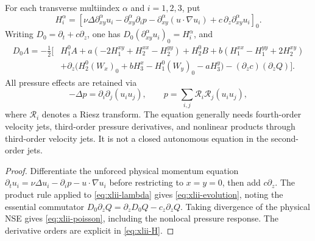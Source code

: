 \begin{theorem}
\label{thm:xlii-full}
For each transverse multiindex $\alpha$ and $i=1,2,3$, put
\begin{equation}\label{eq:xlii-H}
H_i^\alpha=\left[
\nu\Delta\partial_{xy}^\alpha u_i
-\partial_{xy}^\alpha\partial_i p
-\partial_{xy}^\alpha(u\cdot\nabla u_i)
+c\,\partial_z\partial_{xy}^\alpha u_i
\right]_0.
\end{equation}
Writing $D_0=\partial_t+c\partial_z$, one has
$D_0(\partial_{xy}^\alpha u_i)_0=H_i^\alpha$, and
\begin{equation}\label{eq:xlii-evolution}
\boxed{\begin{aligned}
D_0\Lambda=-\frac12\big[&
H_1^0 A+a(-2H_1^{xy}+H_2^{xx}-H_2^{yy})
+H_2^0 B+b(H_1^{xx}-H_1^{yy}+2H_2^{xy})\\
&+\partial_z\big(H_2^0(W_x)_0+bH_3^x
-H_1^0(W_y)_0-aH_3^y\big)
-(\partial_zc)(\partial_zQ)\big].
\end{aligned}}
\end{equation}
All pressure effects are retained via
\begin{equation}\label{eq:xlii-poisson}
-\Delta p=\partial_i\partial_j(u_iu_j),\qquad
p=\sum_{i,j}\mathcal R_i\mathcal R_j(u_iu_j),
\end{equation}
where $\mathcal R_i$ denotes a Riesz transform.
The equation generally needs fourth-order velocity
jets, third-order pressure derivatives, and nonlinear
products through third-order velocity jets. It is not
a closed autonomous equation in the second-order jets.
\end{theorem}
\begin{proof}
Differentiate the unforced physical momentum equation
$\partial_tu_i=\nu\Delta u_i-\partial_i p-u\cdot\nabla u_i$
before restricting to $x=y=0$, then add $c\partial_z$.
The product rule applied to \eqref{eq:xlii-lambda} gives
\eqref{eq:xlii-evolution}, noting the essential commutator
$D_0\partial_zQ=\partial_zD_0Q-c_z\partial_zQ$.
Taking divergence of the physical NSE gives
\eqref{eq:xlii-poisson}, including the nonlocal pressure
response. The derivative orders are explicit in
\eqref{eq:xlii-H}.
\end{proof}

